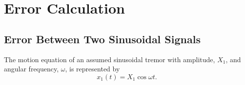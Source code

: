 \chapter{Error Calculation}
\section{Error Between Two Sinusoidal Signals}
\label{Ap_Err2S}

The motion equation of an assumed sinusoidal tremor with amplitude, $X_1$, and angular frequency, $\omega$, is represented by
\begin{equation}
x_1(t)= X_1 \cos \omega t.
\end{equation}
